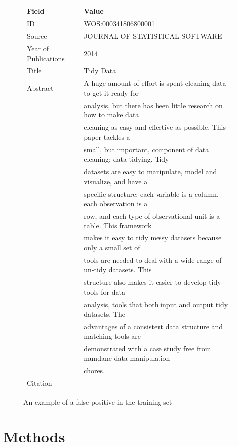 \documentclass[12pt, a4paper]{article}
\begin{document}
\begin{figure}[H]
	\begin{tabular}{ll}
		\toprule
		Field & Value\\
		\midrule
		ID & WOS:000341806800001 \\
		Source & JOURNAL OF STATISTICAL SOFTWARE \\
		Year of Publications & 2014 \\
		Title & Tidy Data \\
		Abstract & A huge amount of effort is spent cleaning data to get it ready for\\
		&analysis, but there has been little research on how to make data\\
		&cleaning as easy and effective as possible. This paper tackles a\\
		&small, but important, component of data cleaning: data tidying. Tidy\\
		&datasets are easy to manipulate, model and visualize, and have a\\
		&specific structure: each variable is a column, each observation is a\\
		&row, and each type of observational unit is a table. This framework\\
		&makes it easy to tidy messy datasets because only a small set of\\
		&tools are needed to deal with a wide range of un-tidy datasets. This\\
		&structure also makes it easier to develop tidy tools for data\\
		&analysis, tools that both input and output tidy datasets. The\\
		&advantages of a consistent data structure and matching tools are\\
		&demonstrated with a case study free from mundane data manipulation\\
		&chores. \\
		Citation & \cite{wickham2014tidy}\\
		\bottomrule
	\end{tabular}
	\caption{An example of a false positive in the training set}\label{badPos}
\end{figure}

\section{Methods}
\end{document}
